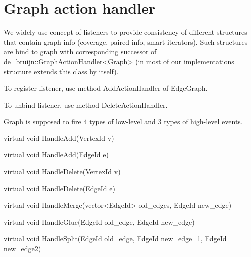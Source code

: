 \section{Graph action handler}

We widely use concept of listeners to provide consistency of different structures that contain graph info (coverage, paired info, smart iterators). Such structures are bind to graph with corresponding successor of de_bruijn::GraphActionHandler<Graph> (in most of our implementations structure extends this class by itself).

To register listener, use method AddActionHandler of EdgeGraph.

To unbind listener, use method DeleteActionHandler.

Graph is supposed to fire 4 types of low-level and 3 types of high-level events.

	virtual void HandleAdd(VertexId v) {
	}

	virtual void HandleAdd(EdgeId e) {
	}

	virtual void HandleDelete(VertexId v) {
	}

	virtual void HandleDelete(EdgeId e) {
	}

	virtual void HandleMerge(vector<EdgeId> old_edges, EdgeId new_edge) {
	}

	virtual void HandleGlue(EdgeId old_edge, EdgeId new_edge) {
	}

	virtual void HandleSplit(EdgeId old_edge, EdgeId new_edge_1,
			EdgeId new_edge2) {
	}

